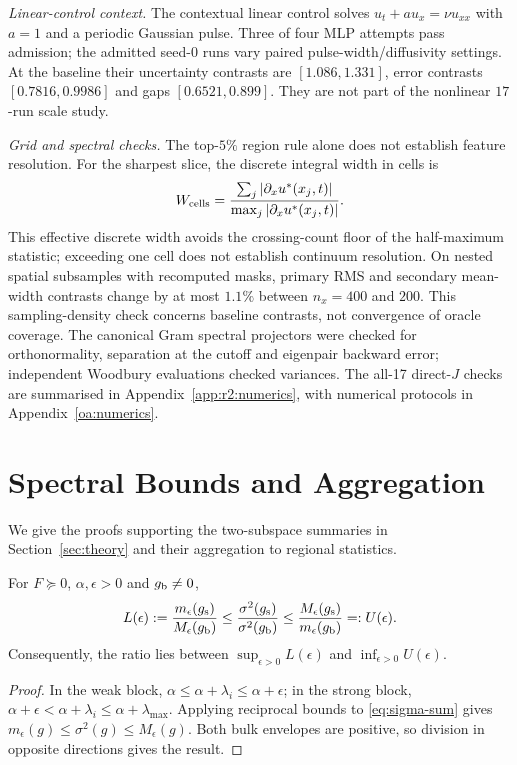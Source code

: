\emph{Linear-control context.}
The contextual linear control solves $u_t+a u_x=\nu u_{xx}$ with $a=1$ and a
periodic Gaussian pulse. Three of four MLP attempts pass admission; the admitted
seed-$0$ runs vary paired pulse-width/diffusivity settings. At the baseline their
uncertainty contrasts are $[1.086,1.331]$, error contrasts $[0.7816,0.9986]$ and
gaps $[0.6521,0.899]$. They are not part of the nonlinear $17$-run scale study.

\emph{Grid and spectral checks.}\label{app:grid}\label{app:spectralchecks}
The top-$5\%$ region rule alone does not establish feature resolution. For the sharpest
slice, the discrete integral width in cells is
\[
 W_{\rm cells}=\frac{\sum_j|\partial_xu^\ast(x_j,t)|}{\max_j|\partial_xu^\ast(x_j,t)|}.
\]
This effective discrete width avoids the crossing-count floor of the half-maximum
statistic; exceeding one cell does not establish continuum resolution. On nested
spatial subsamples with recomputed masks, primary RMS and secondary mean-width
contrasts change by at most $1.1\%$ between $n_x=400$ and $200$. This sampling-density
check concerns baseline contrasts, not convergence of oracle coverage. The canonical Gram spectral projectors were checked for
orthonormality, separation at the cutoff and eigenpair backward error; independent
Woodbury evaluations checked variances. The all-17 direct-$J$ checks are summarised
in Appendix~\ref{app:r2:numerics}, with numerical protocols in Appendix~\ref{oa:numerics}.

\section{Spectral Bounds and Aggregation}\label{app:aggregation}

We give the proofs supporting the two-subspace summaries
in Section~\ref{sec:theory} and their aggregation to regional statistics.

\begin{theorem}\label{thm:ceiling}
For $F\succeq0$, $\alpha,\epsilon>0$ and $g_{\mathrm{b}}\ne0$,
\begin{equation}\label{eq:sandwich}
 L(\epsilon):=\frac{m_\epsilon(g_{\mathrm{s}})}{M_\epsilon(g_{\mathrm{b}})}
 \le\frac{\sigma^2(g_{\mathrm{s}})}{\sigma^2(g_{\mathrm{b}})}
 \le\frac{M_\epsilon(g_{\mathrm{s}})}{m_\epsilon(g_{\mathrm{b}})}=:U(\epsilon).
\end{equation}
Consequently, the ratio lies between $\sup_{\epsilon>0}L(\epsilon)$ and
$\inf_{\epsilon>0}U(\epsilon)$.
\end{theorem}
\begin{proof}
In the weak block, $\alpha\le\alpha+\lambda_i\le\alpha+\epsilon$; in the strong
block, $\alpha+\epsilon<\alpha+\lambda_i\le\alpha+\lambda_{\max}$.
Applying reciprocal bounds to \eqref{eq:sigma-sum} gives
$m_\epsilon(g)\le\sigma^2(g)\le M_\epsilon(g)$.
Both bulk envelopes are positive, so division in opposite directions gives the result.
\end{proof}

